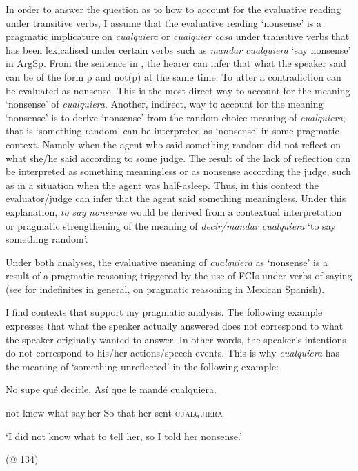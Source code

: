   In order to answer the question as to how to account for the evaluative reading under transitive verbs, I assume that the evaluative reading ‘nonsense’ is a pragmatic implicature on \textit{cualquiera} or \textit{cualquier cosa} under transitive verbs that has been lexicalised under certain verbs such as \textit{mandar cualquiera} ‘say nonsense’ in ArgSp. From the sentence in , the hearer can infer that what the speaker said can be of the form p and not(p) at the same time. To utter a contradiction can be evaluated as nonsense. This is the most direct way to account for the meaning ‘nonsense’ of \textit{cualquiera}. Another, indirect, way to account for the meaning ‘nonsense’ is to derive ‘nonsense’ from the random choice meaning of \textit{cualquiera}; that is ‘something random’ can be interpreted as ‘nonsense’ in some pragmatic context. Namely when the agent who said something random did not reflect on what she/he said according to some judge. The result of the lack of reflection can be interpreted as something meaningless or as nonsense according the judge, such as in a situation when the agent was half-asleep. Thus, in this context the evaluator/judge can infer that the agent said something meaningless. Under this explanation, \textit{to say} \textit{nonsense} would be derived from a contextual interpretation or pragmatic strengthening of the meaning of \textit{decir/mandar cualquiera} ‘to say something random’. 

  Under both analyses, the evaluative meaning of \textit{cualquiera} as ‘nonsense’ is a result of a pragmatic reasoning triggered by the use of FCIs under verbs of saying (see \citealt{Aloni2005} for indefinites in general, \citealt{Author2020a} on pragmatic reasoning in Mexican Spanish). 

  I find contexts that support my pragmatic analysis. The following example expresses that what the speaker actually answered does not correspond to what the speaker originally wanted to answer. In other words, the speaker’s intentions do not correspond to his/her actions/speech events. This is why \textit{cualquiera} has the meaning of ‘something unreflected’ in the following example:

    No  supe  qué  decirle,  Así  que  le  mandé  cualquiera.

    not  knew  what  say.her  So  that  her  sent  \textsc{cualquiera}

    ‘I did not know what to tell her, so I told her nonsense.’

    (@ 134)


